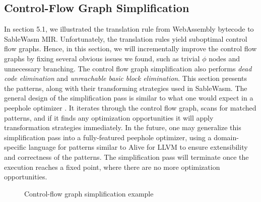 \subsection{Control-Flow Graph Simplification}

In section 5.1, we illustrated the translation rule from WebAssembly bytecode to
SableWasm MIR. Unfortunately, the translation rules yield suboptimal control
flow graphs. Hence, in this section, we will incrementally improve the control
flow graphs by fixing several obvious issues we found, such as trivial $\phi$
nodes and unnecessary branching. The control flow graph simplification also
performs \emph{dead code elimination} and \emph{unreachable basic block
    elimination}. This section presents the patterns, along with their
transforming strategies used in SableWasm. The general design of the
simplification pass is similar to what one would expect in a peephole optimizer
\cite{peephole-opt}. It iterates through the control flow graph, scans for
matched patterns, and if it finds any optimization opportunities it will apply
transformation strategies immediately. In the future, one may generalize this
simplification pass into a fully-featured peephole optimizer, using a
domain-specific language for patterns similar to Alive
\cite{alive, alive-in-lean} for LLVM to ensure extensibility and correctness of
the patterns. The simplification pass will terminate once the execution reaches
a fixed point, where there are no more optimization opportunities.

\begin{figure}
    \begin{minipage}[t]{.5\textwidth}
        
    \end{minipage}\hfill
    \begin{minipage}[t]{.5\textwidth}
        
    \end{minipage}
    \caption{Control-flow graph simplification example}
    \label{fig:simplify-example}
\end{figure}

